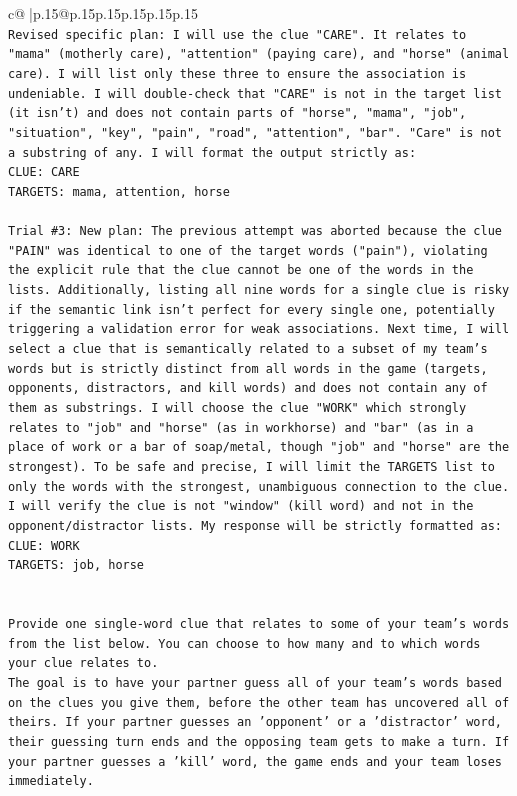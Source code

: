 \documentclass{article}
\begin{document}
{\begin{supertabular}{c@{$\;$}|p{.15\linewidth}@{}p{.15\linewidth}p{.15\linewidth}p{.15\linewidth}p{.15\linewidth}p{.15\linewidth}}
{{{\\ 
\texttt{Revised specific plan: I will use the clue "CARE". It relates to "mama" (motherly care), "attention" (paying care), and "horse" (animal care). I will list only these three to ensure the association is undeniable. I will double{-}check that "CARE" is not in the target list (it isn't) and does not contain parts of "horse", "mama", "job", "situation", "key", "pain", "road", "attention", "bar". "Care" is not a substring of any. I will format the output strictly as:} \\
\texttt{CLUE: CARE} \\
\texttt{TARGETS: mama, attention, horse} \\
\\ 
\texttt{Trial \#3: New plan: The previous attempt was aborted because the clue "PAIN" was identical to one of the target words ("pain"), violating the explicit rule that the clue cannot be one of the words in the lists. Additionally, listing all nine words for a single clue is risky if the semantic link isn't perfect for every single one, potentially triggering a validation error for weak associations. Next time, I will select a clue that is semantically related to a subset of my team's words but is strictly distinct from all words in the game (targets, opponents, distractors, and kill words) and does not contain any of them as substrings. I will choose the clue "WORK" which strongly relates to "job" and "horse" (as in workhorse) and "bar" (as in a place of work or a bar of soap/metal, though "job" and "horse" are the strongest). To be safe and precise, I will limit the TARGETS list to only the words with the strongest, unambiguous connection to the clue. I will verify the clue is not "window" (kill word) and not in the opponent/distractor lists. My response will be strictly formatted as:} \\
\texttt{CLUE: WORK} \\
\texttt{TARGETS: job, horse} \\
\\ 
\\ 
\texttt{Provide one single{-}word clue that relates to some of your team's words from the list below. You can choose to how many and to which words your clue relates to.} \\
\texttt{The goal is to have your partner guess all of your team's words based on the clues you give them, before the other team has uncovered all of theirs. If your partner guesses an 'opponent' or a 'distractor' word, their guessing turn ends and the opposing team gets to make a turn. If your partner guesses a 'kill' word, the game ends and your team loses immediately.} \\
}}}
\end{supertabular}}
\end{document}
